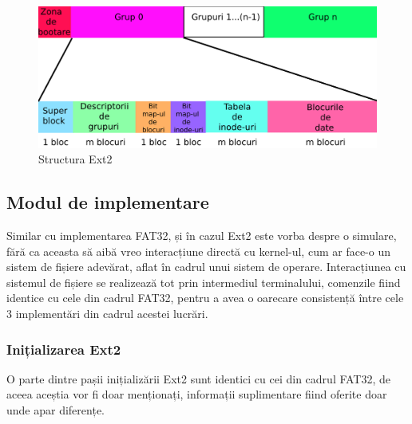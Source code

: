 \clearpage
\begin{figure}[h!]
    \centering
    \includegraphics[width=1.0\linewidth]{images/2.6.png}
    \caption{Structura Ext2}
    \label{fig:enter-label}
\end{figure}

\bigskip


\subsection{Modul de implementare}

Similar cu implementarea FAT32, și în cazul Ext2 este vorba despre o simulare, fără ca aceasta să aibă vreo interacțiune directă cu kernel-ul, cum ar face-o un sistem de fișiere adevărat, aflat în cadrul unui sistem de operare. Interacțiunea cu sistemul de fișiere se realizează tot prin intermediul terminalului, comenzile fiind identice cu cele din cadrul FAT32, pentru a avea o oarecare consistență între cele 3 implementări din cadrul acestei lucrări.

\subsubsection{Inițializarea Ext2}

O parte dintre pașii inițializării Ext2 sunt identici cu cei din cadrul FAT32, de aceea aceștia vor fi doar menționați, informații suplimentare fiind oferite doar unde apar diferențe.

